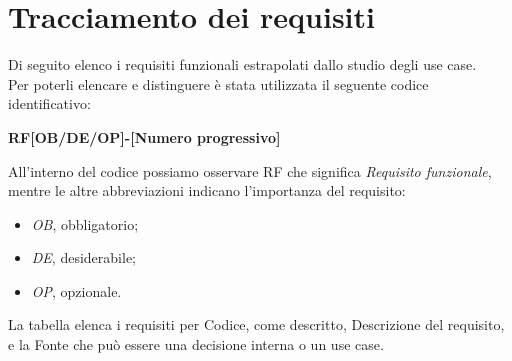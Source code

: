 \section{Tracciamento dei requisiti}
Di seguito elenco i requisiti funzionali estrapolati dallo studio degli use case.\\
Per poterli elencare e distinguere è stata utilizzata il seguente codice identificativo:
\begin{center}
\textbf{RF[OB/DE/OP]-[Numero progressivo]}
\end{center}
All'interno del codice possiamo osservare RF che significa \textit{Requisito funzionale}, mentre le altre abbreviazioni indicano l'importanza del requisito:
\begin{itemize}
\item \textit{OB}, obbligatorio;
\item \textit{DE}, desiderabile;
\item \textit{OP}, opzionale.
\end{itemize}
La tabella elenca i requisiti per Codice, come descritto, Descrizione del requisito, e la Fonte che può essere una decisione interna o un use case.
\\\\
\setlength{\arrayrulewidth}{0.3mm}
\renewcommand{\arraystretch}{2.5}
